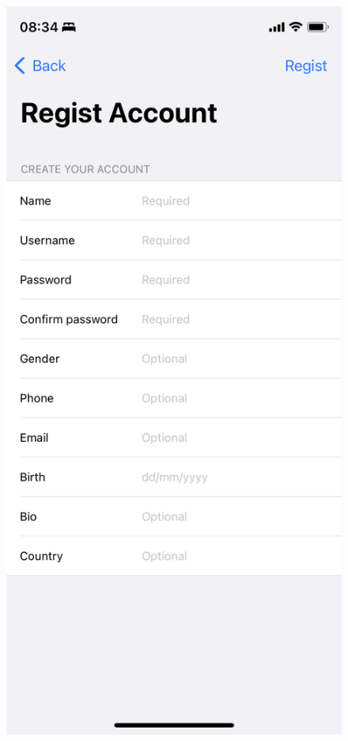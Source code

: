 \documentclass[../DoAn.tex]{subfiles}
\begin{document}
\begin{figure}[H]
\begin{minipage}{0.5\textwidth}
\includegraphics[width=0.95\linewidth]{Hinhve/Application/SignUp.png}

\end{minipage}
\end{figure}
\end{document}
